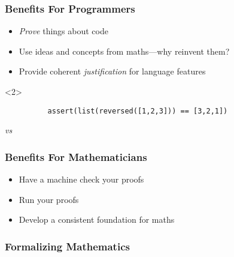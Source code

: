 \documentclass[usenames,dvipsnames]{beamer}
\begin{document}
\begin{frame}[fragile]
  \frametitle{Benefits For Programmers}
  \begin{itemize}
    \item<2-> \emph{Prove} things about code 
    \item<3-> Use ideas and concepts from maths---why reinvent them?
    \item<4-> Provide coherent \emph{justification} for language features
  \end{itemize}
  \begin{overlayarea}{\linewidth}{0cm}
    \begin{onlyenv}<2>
      \centering
      \begin{minipage}{0.7\linewidth}
        \begin{verbatim}
          assert(list(reversed([1,2,3])) == [3,2,1])
        \end{verbatim}
      \end{minipage}

      \emph{vs}

    \end{onlyenv}
  \end{overlayarea}
\end{frame}
\begin{frame}
  \frametitle{Benefits For Mathematicians}
  \begin{itemize}
    \item<2-> Have a machine check your proofs
    \item<3-> Run your proofs
    \item<4-> \alert<5>{Develop a consistent foundation for maths}
  \end{itemize}

  \begin{overlayarea}{\linewidth}{1cm}
  \end{overlayarea}
\end{frame}
\begin{frame}[fragile]
  \frametitle{Formalizing Mathematics}
  \begin{columns}
  \end{columns}

  \vfill
  
  \begin{columns}
  \end{columns}

  \vfill

\end{frame}
\end{document}
